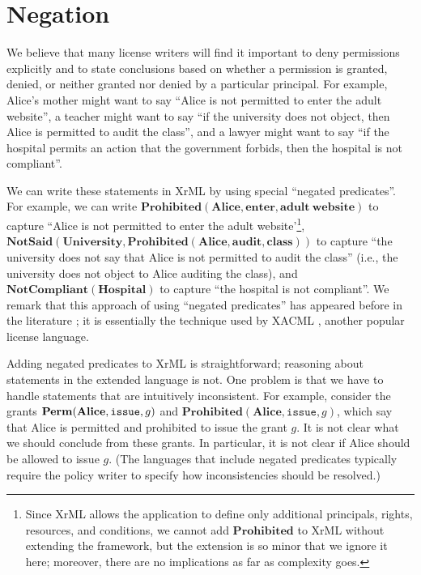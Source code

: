 \documentclass{acmtrans2m}
\newcommand{\<}{
}
\renewcommand{\>}{\rangle}
\newcommand{\Permitted}{\mathit{\bf Perm}}
\newcommand{\issue}{\mathtt{issue}}
\newcommand{\pred}[1]{\mathbf{#1}}
\newcommand{\const}[1]{\mathbf{#1}}
\begin{document}
\section{Negation}\label{s:extend}
We believe that many license writers will find it important to deny permissions explicitly and to state
conclusions based on whether a permission is granted, denied, or neither granted nor denied by a particular
principal.  For example, Alice's mother might want to say ``Alice is not permitted to enter the adult
website'', a teacher might want to say ``if the university does not object, then Alice is permitted to audit
the class'', and a lawyer might want to say ``if the hospital permits an action that the government forbids,
then the hospital is not compliant''.

\begin{sloppypar}
We can write these statements in XrML by using special ``negated predicates''.  For example, we can write
$\pred{Prohibited}(\const{Alice}, \const{enter}, \const{adult~website})$ to capture
``Alice is not permitted to enter the adult website'\footnote{Since XrML allows the application to define only additional principals, rights, resources, and
conditions, we cannot add $\pred{Prohibited}$ to XrML without extending the framework, but the extension is
so minor that we ignore it here; moreover, there are no implications as far as complexity goes.},
$\pred{NotSaid}(\const{University}, \pred{Prohibited}(\const{Alice}, \const{audit}, \const{class}))$
to capture ``the university does not say that Alice is not permitted to audit the class'' (i.e., the
university does not object to Alice auditing the class), and $\pred{NotCompliant}(\const{Hospital})$ to
capture ``the hospital is not compliant''.  We remark that this approach of using ``negated predicates'' has
appeared before in the literature \cite{JSS,MS04}; it is essentially the technique used by XACML \cite{XACML},
another popular license language.
\end{sloppypar}

Adding negated predicates to XrML is straightforward; reasoning about statements in the extended language is
not.  One problem is that we have to handle statements that are intuitively inconsistent.  For example,
consider the grants $\Permitted(\const{Alice}, \issue, g)$ and $\pred{Prohibited}(\const{Alice}, \issue, g)$,
which say that Alice is permitted and prohibited to issue the grant $g$.  It is not clear what we should
conclude from these grants.  In particular, it is not clear if Alice should be allowed to issue $g$.  (The
languages that include negated predicates typically require the policy writer to specify how inconsistencies
should be resolved.)
\end{document}
